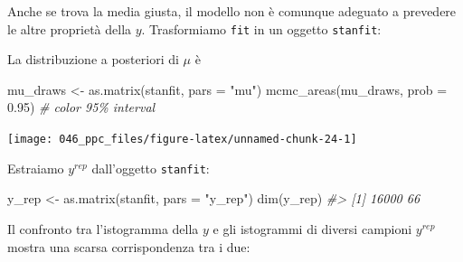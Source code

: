 \documentclass[
  10pt,
  italian,
  a4paper,
  extrafontsizes,onecolumn,openright
  ]{memoir}
\newenvironment{Shaded}{\begin{snugshade}}{\end{snugshade}}
\newcommand{\AttributeTok}[1]{\textcolor[rgb]{0.77,0.63,0.00}{#1}}
\newcommand{\CommentTok}[1]{\textcolor[rgb]{0.56,0.35,0.01}{\textit{#1}}}
\newcommand{\DecValTok}[1]{\textcolor[rgb]{0.00,0.00,0.81}{#1}}
\newcommand{\FloatTok}[1]{\textcolor[rgb]{0.00,0.00,0.81}{#1}}
\newcommand{\FunctionTok}[1]{\textcolor[rgb]{0.00,0.00,0.00}{#1}}
\newcommand{\NormalTok}[1]{#1}
\newcommand{\OtherTok}[1]{\textcolor[rgb]{0.56,0.35,0.01}{#1}}
\newcommand{\SpecialCharTok}[1]{\textcolor[rgb]{0.00,0.00,0.00}{#1}}
\newcommand{\StringTok}[1]{\textcolor[rgb]{0.31,0.60,0.02}{#1}}
\begin{document}
\noindent
Anche se trova la media giusta, il modello non è comunque adeguato a prevedere le altre proprietà della \(y\). Trasformiamo \texttt{fit} in un oggetto \texttt{stanfit}:

\begin{Shaded}
\end{Shaded}

\noindent
La distribuzione a posteriori di \(\mu\) è

\begin{Shaded}
\begin{Highlighting}[]
\NormalTok{mu\_draws }\OtherTok{\textless{}{-}} \FunctionTok{as.matrix}\NormalTok{(stanfit, }\AttributeTok{pars =} \StringTok{"mu"}\NormalTok{)}
\FunctionTok{mcmc\_areas}\NormalTok{(mu\_draws, }\AttributeTok{prob =} \FloatTok{0.95}\NormalTok{) }\CommentTok{\# color 95\% interval}
\end{Highlighting}
\end{Shaded}

\begin{center}\texttt{[image: 046\_ppc\_files/figure-latex/unnamed-chunk-24-1]} \end{center}

\noindent
Estraiamo \(y^{rep}\) dall'oggetto \texttt{stanfit}:

\begin{Shaded}
\begin{Highlighting}[]
\NormalTok{y\_rep }\OtherTok{\textless{}{-}} \FunctionTok{as.matrix}\NormalTok{(stanfit, }\AttributeTok{pars =} \StringTok{"y\_rep"}\NormalTok{)}
\FunctionTok{dim}\NormalTok{(y\_rep) }
\CommentTok{\#\textgreater{} [1] 16000    66}
\end{Highlighting}
\end{Shaded}

\noindent
Il confronto tra l'istogramma della \(y\) e gli istogrammi di diversi campioni \(y^{rep}\) mostra una scarsa corrispondenza tra i due:

\begin{Shaded}
\end{Shaded}
\end{document}
